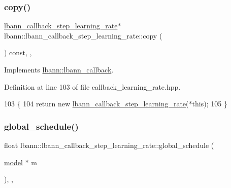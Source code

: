 \subsubsection{\texorpdfstring{copy()}{copy()}}
{\footnotesize\ttfamily \hyperlink{classlbann_1_1lbann__callback__step__learning__rate}{lbann\+\_\+callback\+\_\+step\+\_\+learning\+\_\+rate}$\ast$ lbann\+::lbann\+\_\+callback\+\_\+step\+\_\+learning\+\_\+rate\+::copy (\begin{DoxyParamCaption}{ }\end{DoxyParamCaption}) const\hspace{0.3cm}{\ttfamily [inline]}, {\ttfamily [override]}, {\ttfamily [virtual]}}



Implements \hyperlink{classlbann_1_1lbann__callback_a9f545d1269a8c7af335625d049691f26}{lbann\+::lbann\+\_\+callback}.



Definition at line 103 of file callback\+\_\+learning\+\_\+rate.\+hpp.


\begin{DoxyCode}
103                                                            \{
104     \textcolor{keywordflow}{return} \textcolor{keyword}{new} \hyperlink{classlbann_1_1lbann__callback__step__learning__rate_acaf6b1a65c8734b21a62a3c1f16447ca}{lbann\_callback\_step\_learning\_rate}(*\textcolor{keyword}{this});
105   \}
\end{DoxyCode}
\mbox{\label{classlbann_1_1lbann__callback__step__learning__rate_a440671682e8c041a7208af77231059ec}} 
\subsubsection{\texorpdfstring{global\+\_\+schedule()}{global\_schedule()}}
{\footnotesize\ttfamily float lbann\+::lbann\+\_\+callback\+\_\+step\+\_\+learning\+\_\+rate\+::global\+\_\+schedule (\begin{DoxyParamCaption}\item[{\hyperlink{classlbann_1_1model}{model} $\ast$}]{m }\end{DoxyParamCaption})\hspace{0.3cm}{\ttfamily [override]}, {\ttfamily [protected]}, {\ttfamily [virtual]}}

